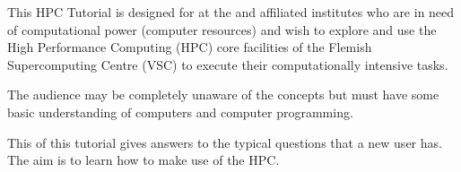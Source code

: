 \pagestyle{plain}

This HPC Tutorial is designed for  at the
\strong{\university} and affiliated institutes who are in need of
computational power (computer resources) and wish to explore and use the High
Performance Computing (HPC) core facilities of the Flemish Supercomputing Centre (VSC)
to execute their computationally intensive tasks.

The audience may be completely unaware of the \hpc concepts but must have some
basic understanding of computers and computer programming.


This  of this tutorial gives answers to the typical
questions that a new \hpc user has. The aim is to learn how to make use of the
HPC.

